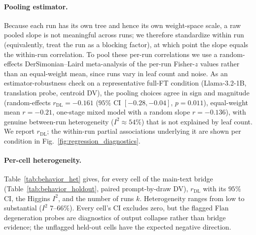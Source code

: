 \documentclass{article}
\theoremstyle{definition}
\theoremstyle{plain}
\begin{document}
\paragraph{Pooling estimator.} Because each run has its own tree and hence its own weight-space scale, a
raw pooled slope is not meaningful across runs; we therefore standardize within run (equivalently, treat
the run as a blocking factor), at which point the slope equals the within-run correlation. To pool these
per-run correlations we use a random-effects DerSimonian--Laird meta-analysis of the per-run Fisher-$z$
values rather than an equal-weight mean, since runs vary in leaf count and noise. As an estimator-robustness check on a representative full-FT
condition (Llama-3.2-1B, translation probe, centroid DV), the pooling choices agree in sign and
magnitude (random-effects $r_{\mathrm{DL}}=-0.161$ ($95\%$ CI $[-0.28,-0.04]$, $p=0.011$), equal-weight mean
$r=-0.21$, one-stage mixed model with a random slope $r=-0.136$), with genuine between-run heterogeneity
($I^2\approx54\%$) that is not explained by leaf count. We report $r_{\mathrm{DL}}$; the within-run partial
associations underlying it are shown per condition in Fig.~\ref{fig:regression_diagnostics}.

\paragraph{Per-cell heterogeneity.} Table~\ref{tab:behavior_het} gives, for every cell of the main-text
bridge (Table~\ref{tab:behavior_holdout}, paired prompt-by-draw DV), $r_{\mathrm{DL}}$ with its $95\%$ CI,
the Higgins $I^2$, and the number of runs $k$. Heterogeneity ranges from low to substantial ($I^2$ $7$--$66\%$).
Every cell's CI excludes zero, but the flagged Flan degeneration probes are diagnostics of output
collapse rather than bridge evidence; the unflagged held-out cells have the expected negative direction.
\end{document}
